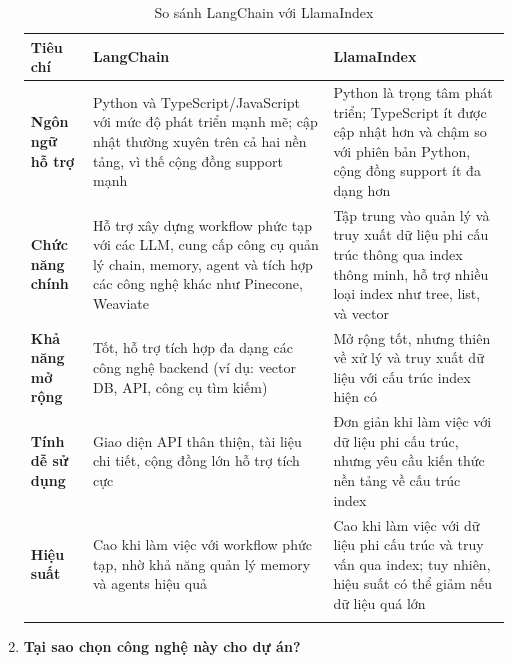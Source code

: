 \begin{enumerate}
	\begin{longtable}{|>{\raggedright\arraybackslash}m{4cm}|>{\raggedright\arraybackslash}m{5.5cm}|>{\raggedright\arraybackslash}m{5.5cm}|}
		\hline
		\textbf{Tiêu chí} & \textbf{LangChain} & \textbf{LlamaIndex} \\ 
		\hline
		\textbf{Ngôn ngữ hỗ trợ} & Python và TypeScript/JavaScript với mức độ phát triển mạnh mẽ; cập nhật thường xuyên trên cả hai nền tảng, vì thế cộng đồng support mạnh & Python là trọng tâm phát triển; TypeScript ít được cập nhật hơn và chậm so với phiên bản Python, cộng đồng support ít đa dạng hơn \\ 
		\hline
		\textbf{Chức năng chính} & Hỗ trợ xây dựng workflow phức tạp với các LLM, cung cấp công cụ quản lý chain, memory, agent và tích hợp các công nghệ khác như Pinecone, Weaviate & Tập trung vào quản lý và truy xuất dữ liệu phi cấu trúc thông qua index thông minh, hỗ trợ nhiều loại index như tree, list, và vector \\ 
		\hline
		\textbf{Khả năng mở rộng} & Tốt, hỗ trợ tích hợp đa dạng các công nghệ backend (ví dụ: vector DB, API, công cụ tìm kiếm) & Mở rộng tốt, nhưng thiên về xử lý và truy xuất dữ liệu với cấu trúc index hiện có \\ 
		\hline
		\textbf{Tính dễ sử dụng} & Giao diện API thân thiện, tài liệu chi tiết, cộng đồng lớn hỗ trợ tích cực & Đơn giản khi làm việc với dữ liệu phi cấu trúc, nhưng yêu cầu kiến thức nền tảng về cấu trúc index \\ 
		\hline
		\textbf{Hiệu suất} & Cao khi làm việc với workflow phức tạp, nhờ khả năng quản lý memory và agents hiệu quả & Cao khi làm việc với dữ liệu phi cấu trúc và truy vấn qua index; tuy nhiên, hiệu suất có thể giảm nếu dữ liệu quá lớn \\ 
		\hline
		\caption{So sánh LangChain với LlamaIndex}
	\end{longtable}
	
	
	\item \textbf{Tại sao chọn công nghệ này cho dự án?}
	

\end{enumerate}
